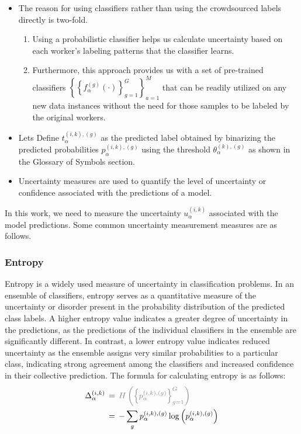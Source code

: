 \documentclass[sn-nature]{bst/sn-jnl}
\begin{document}
\begin{itemize}
    \item The reason for using classifiers rather than using the crowdsourced labels directly is two-fold.
    \begin{enumerate}
        \item Using a probabilistic classifier helps us calculate uncertainty based on each worker's labeling patterns that the classifier learns.
        \item Furthermore, this approach provides us with a set of pre-trained classifiers ${\left\{ {\left\{f_{\alpha}^{(g)}(\cdot) \right\}}_{g=1}^G  \right\}}_{a=1}^{M} $ that can be readily utilized on any new data instances without the need for those samples to be labeled by the original workers.
    \end{enumerate}
    \item Lets Define $t_{\alpha}^{(i,k),(g)} $ as the predicted label obtained by binarizing the predicted probabilities $p_{\alpha}^{ (i,k),(g)} $ using the threshold $\theta_{\alpha}^{(k),(g)} $ as shown in the Glossary of Symbols section.
    \item Uncertainty measures are used to quantify the level of uncertainty or confidence associated with the predictions of a model.
\end{itemize}
In this work, we need to measure the uncertainty $u_{\alpha}^{(i,k)}$ associated with the model predictions. Some common uncertainty measurement measures are as follows.
\subsubsection{Entropy}
Entropy is a widely used measure of uncertainty in classification problems. In an ensemble of classifiers, entropy serves as a quantitative measure of the uncertainty or disorder present in the probability distribution of the predicted class labels. A higher entropy value indicates a greater degree of uncertainty in the predictions, as the predictions of the individual classifiers in the ensemble are significantly different. In contrast, a lower entropy value indicates reduced uncertainty as the ensemble assigns very similar probabilities to a particular class, indicating strong agreement among the classifiers and increased confidence in their collective prediction. The formula for calculating entropy is as follows:
\begin{align}
    \Delta_{\alpha}^{(i,k)}
    \, & = \, \textcolor{gray}{H\left({\left\{p_{\alpha}^{(i,k),(g)}\right\}}_{g=1}^{G}\right)} \\
    \, & = \, -\sum_{g}{p_{\alpha}^{(i,k),(g)} \log\left(p_{\alpha}^{(i,k),(g)}\right)}
    \label{eq:crowd.Eq.5.uncertainty}
\end{align}
\end{document}

